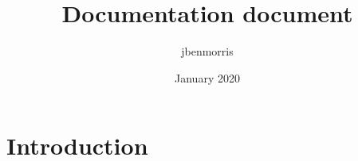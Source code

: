 \documentclass{article}
\title{Documentation document}
\author{jbenmorris }
\date{January 2020}
\begin{document}
\maketitle

\section{Introduction}
\end{document}

